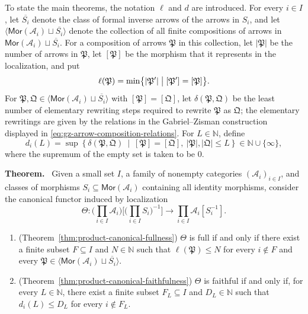 \documentclass[10pt,a4paper]{amsart}
\theoremstyle{plain}
\theoremstyle{definition}
\theoremstyle{remark}
\begin{document}
To state the main theorems, the notation $\ell$ and $d$ are introduced.
For every $i\in I$, let $\overline{S_i}$ denote the class of formal inverse arrows of the arrows in $S_i$, and let $\langle\mathsf{Mor}(\mathcal A_i)\sqcup\overline{S_i}\rangle$ denote the collection of all finite compositions of arrows in $\mathsf{Mor}(\mathcal A_i)\sqcup\overline{S_i}$.
For a composition of arrows $\mathfrak P$ in this collection, let $|\mathfrak P|$ be the number of arrows in $\mathfrak P$, let $[\mathfrak P]$ be the morphism that it represents in the localization, and put
\[
  \ell(\mathfrak P)
  =\min\bigl\{|\mathfrak P'|\bigm|[\mathfrak P']=[\mathfrak P]\bigr\}.
\]
For $\mathfrak P,\mathfrak Q \in \langle\mathsf{Mor}(\mathcal A_i)\sqcup\overline{S_i}\rangle$ with $[\mathfrak P]=[\mathfrak Q]$, let $\delta(\mathfrak P,\mathfrak Q)$ be the least number of elementary rewriting steps required to rewrite $\mathfrak P$ as $\mathfrak Q$; the elementary rewritings are given by the relations in the Gabriel--Zisman construction displayed in \eqref{eq:gz-arrow-composition-relations}.
For $L\in\mathbb N$, define
\[
  d_i(L)=\sup\left\{
  \delta(\mathfrak P,\mathfrak Q)\ \middle|\
  [\mathfrak P]=[\mathfrak Q],\
  |\mathfrak P|,|\mathfrak Q|\leq L
  \right\}\in\mathbb N\cup\{\infty\},
\]
where the supremum of the empty set is taken to be $0$.

\medskip

\noindent\textbf{Theorem.} \ Given a small set $I$, a family of nonempty categories $(\mathcal A_i)_{i\in I}$, and classes of morphisms $S_i\subseteq\mathsf{Mor}(\mathcal A_i)$ containing all identity morphisms, consider the canonical functor induced by localization
\[
  \Theta:
  \bigg(\prod_{i\in I}\mathcal A_i\bigg)
  \bigg[\bigg(\prod_{i\in I}S_i\bigg)^{-1}\bigg]
  \longrightarrow
  \prod_{i\in I}\mathcal A_i[S_i^{-1}].
\]
\begin{enumerate}[label=\textup{(\arabic*)}]
  \item (Theorem~\ref{thm:product-canonical-fullness}) $\Theta$ is full if and only if there exist a finite subset $F\subseteq I$ and $N\in\mathbb N$ such that $\ell(\mathfrak P)\leq N$ for every $i \notin F$ and every $\mathfrak P\in\langle\mathsf{Mor}(\mathcal A_i)\sqcup\overline{S_i}\rangle$.
  \item (Theorem~\ref{thm:product-canonical-faithfulness}) $\Theta$ is faithful if and only if, for every $L\in\mathbb N$, there exist a finite subset $F_L\subseteq I$ and $D_L\in\mathbb N$ such that $d_i(L)\leq D_L$ for every $i \notin F_L$.
\end{enumerate}
\end{document}
